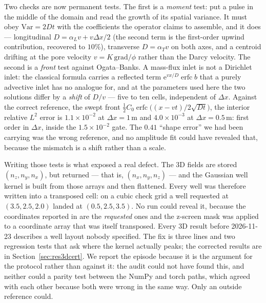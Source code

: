 Two checks are now permanent tests. The first is a \emph{moment} test: put a
pulse in the middle of the domain and read the growth of its spatial variance.
It must obey $\mathrm{Var} = 2Dt$ with the coefficients the operator claims to
assemble, and it does --- longitudinal $D = \alpha_L v + v\Delta x/2$ (the
second term is the first-order upwind contribution, recovered to $10\%$),
transverse $D = \alpha_T v$ on both axes, and a centroid drifting at the pore
velocity $v = K\,\mathrm{grad}/\phi$ rather than the Darcy velocity. The second
is a \emph{front} test against Ogata--Banks. A mass-flux inlet is not a Dirichlet
inlet: the classical formula carries a reflected term
$\mathrm{e}^{vx/D}\operatorname{erfc} b$ that a purely advective inlet has no
analogue for, and at the parameters used here the two solutions differ by a
\emph{shift} of $D/v$ --- five to ten cells, independent of $\Delta x$. Against
the correct reference, the swept front
$\tfrac12 C_0\operatorname{erfc}\big((x-vt)/2\sqrt{Dt}\big)$, the interior
relative $L^2$ error is $1.1\times10^{-2}$ at $\Delta x = 1$\,m and
$4.0\times10^{-3}$ at $\Delta x = 0.5$\,m: first order in $\Delta x$, inside the
$1.5\times10^{-2}$ gate. The $0.41$ ``shape error'' we had been carrying was the
wrong reference, and no amplitude fit could have revealed that, because the
mismatch is a shift rather than a scale.

Writing those tests is what exposed a real defect. The 3D fields are stored
$(n_z, n_y, n_x)$, but  returned
 --- that is, $(n_x, n_y, n_z)$ --- and the Gaussian well
kernel is built from those arrays and then flattened. Every well was therefore
written into a transposed cell: on a cubic check grid a well requested at
$(3.5, 2.5, 2.0)$ landed at $(0.5, 2.5, 3.5)$. No run could reveal it, because
the coordinates reported in  are the \emph{requested} ones and
the z-screen mask was applied to a coordinate array that was itself transposed.
Every 3D result before 2026-11-23 describes a well layout nobody specified. The
fix is three lines and two regression tests that ask where the kernel actually
peaks; the corrected results are in Section~\ref{sec:res3dcert}. We report the
episode because it is the argument for the protocol rather than against it: the
audit could not have found this, and neither could a parity test between the
NumPy and torch paths, which agreed with each other because both were wrong in
the same way. Only an outside reference could.

